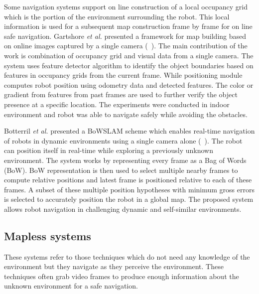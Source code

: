 Some navigation systems support on line construction of a local 
occupancy grid which is the portion of 
the environment surrounding the robot.
This local information is used for a 
subsequent map construction frame by frame 
for on line safe navigation. 
Gartshore \emph{et al.}
presented a framework for map building 
based on online images captured by a single camera
 (~\citet{gartshore02}). 
The main contribution of the work 
is combination of occupancy 
grid and visual data from a single camera.
The system uses feature detector 
algorithm to identify the object boundaries 
based on features in occupancy grids 
from the current frame. While positioning 
module computes robot position using 
odometry data and detected features. 
The color or gradient from 
features from past frames are used 
to further verify the object presence 
at a specific location. 
The experiments were conducted in indoor environment 
and robot was able to navigate safely while 
avoiding the obstacles. 

Botterril \emph{et al.} presented a BoWSLAM scheme 
which enables real-time navigation of robots 
in dynamic environments using a single camera alone 
(~\citet{botteril10}).
The robot can position itself in real-time while exploring 
a previously unknown environment. 
The system works by representing 
every frame as a Bag of Words (BoW). BoW 
representation is then used to select 
multiple nearby frames to compute relative positions 
and latest frame is positioned relative to each of these 
frames. A subset of these multiple position hypotheses 
with minimum gross errors is selected 
to accurately position the robot in a global
map. The proposed system allows robot navigation in 
challenging dynamic and self-similar environments.


\subsection{Mapless systems}
These systems refer to those techniques which do not need 
any knowledge of the environment but they navigate 
as they perceive the environment. These techniques 
often grab video frames to produce enough information 
about the unknown environment for a safe navigation. 

